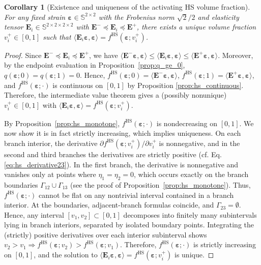 \documentclass[preprint,3p]{elsarticle}
\newcommand{\tenss}[1]{\bm{\mathbf{#1}}}            %
\newcommand{\tensf}[1]{\bm{\mathbf{#1}}}            %
\newcommand{\strain}{\tenss{\varepsilon}}           %
\newcommand{\Ei}{\tensf{E}_i}                       %
\newcommand{\Emin}{\tensf{E}^{-}}                   %
\newcommand{\Emax}{\tensf{E}^{+}}                   %
\newtheorem{corollary}{Corollary}[section]
\begin{document}
\begin{corollary}[Existence and uniqueness of the activating HS volume fraction]\label{cor:uniqueness}
    For any fixed strain $\strain \in \mathbb{S}^{2\times2}$ with the Frobenius norm $\sqrt{2}/2$ and elasticity tensor $\Ei \in \mathbb{S}^{2\times2\times2\times2}$ with $\Emin \preceq \Ei \preceq \Emax$, there exists a unique volume fraction $v_i^+ \in [0,1]$ such that $\langle \Ei \strain, \strain\rangle = f^{\mathrm{HS}}(\strain;v_i^+)$.
\end{corollary}
\begin{proof}
    Since $\Emin \preceq \Ei \preceq \Emax$, we have $\langle\Emin\strain,\strain\rangle \le \langle\Ei\strain,\strain\rangle \le \langle\Emax\strain,\strain\rangle$. Moreover, by the endpoint evaluation in Proposition~\ref{prop:q_ge_0}, $q(\strain;0) = q(\strain;1) = 0$. Hence, $f^\mathrm{HS}(\strain;0) = \langle\Emin\strain,\strain\rangle$, $f^\mathrm{HS}(\strain;1) = \langle\Emax\strain,\strain\rangle$, and $f^\mathrm{HS}(\strain;\cdot)$ is continuous on $[0,1]$ by Proposition \ref{prop:hs_continuous}. Therefore, the intermediate value theorem gives a (possibly nonunique) $v_i^+ \in [0,1]$ with $\langle\Ei \strain,\strain \rangle = f^\mathrm{HS}(\strain;v_i^+)$.

    By Proposition~\ref{prop:hs_monotone}, $f^\mathrm{HS}(\strain;\cdot)$ is nondecreasing on $[0,1]$. We now show it is in fact strictly increasing, which implies uniqueness. On each branch interior, the derivative $\partial f^{\mathrm{HS}}(\strain;v_i^+)/\partial v_i^+$ is nonnegative, and in the second and third branches the derivatives are strictly positive (cf. Eq. \eqref{eq:hs_derivative23}). In the first branch, the derivative is nonnegative and vanishes only at points where $\eta_1 = \eta_2 = 0$, which occurs exactly on the branch boundaries $\Gamma_{12} \cup \Gamma_{13}$ (see the proof of Proposition~\ref{prop:hs_monotone}). Thus, $f^{\mathrm{HS}}(\strain;\cdot)$ cannot be flat on any nontrivial interval contained in a branch interior. At the boundaries, adjacent-branch formulas coincide, and $\Gamma_{23} = \emptyset$. Hence, any interval $[v_1,v_2] \subset [0,1]$ decomposes into finitely many subintervals lying in branch interiors, separated by isolated boundary points. Integrating the (strictly) positive derivatives over each interior subinterval shows $v_2>v_1 \Rightarrow f^\mathrm{HS}(\strain;v_2)>f^\mathrm{HS}(\strain;v_1)$. Therefore, $f^{\mathrm{HS}}(\strain;\cdot)$ is strictly increasing on $[0,1]$, and the solution to $\langle\Ei \strain,\strain \rangle = f^{\mathrm{HS}}(\strain;v_i^+)$ is unique.
\end{proof}
\end{document}
